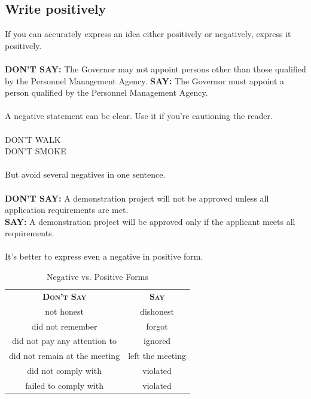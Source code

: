 \documentclass[12pt, letterpaper]{report}
\begin{document}
\begin{linenumbers}
    \section{Write positively}
    If you can accurately express an idea either positively or negatively, express it positively.\\\\
    \textbf{DON'T SAY: }The Governor may not appoint persons other than those qualified by the Personnel Management Agency.
    \textbf{SAY: }The Governor must appoint a person qualified by the Personnel Management Agency.\\\\
    A negative statement can be clear. Use it if you're cautioning the reader.\\\\
    DON'T WALK\\
    DON'T SMOKE\\\\
    But avoid several negatives in one sentence.\\\\
    \textbf{DON'T SAY: }A demonstration project will not be approved unless all application requirements are met.\\
    \textbf{SAY: }A demonstration project will be approved only if the applicant meets all requirements.\\\\
    It's better to express even a negative in positive form. 
    \begin{table}[h]
        \centering
        \begin{tabular}{c|c}
            \textsc{\textbf{Don't Say}}   &  \textsc{\textbf{Say}}\\
            not honest & dishonest \\
            did not remember & forgot \\
            did not pay any attention to & ignored\\
            did not remain at the meeting & left the meeting \\
            did not comply with & violated\\
            failed to comply with & violated
        \end{tabular}
        \caption{Negative vs. Positive Forms}
        \label{tab:posforms}
    \end{table}

\end{linenumbers}
\end{document}
